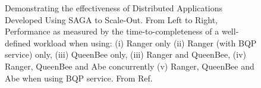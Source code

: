 \documentclass[a4paper,10pt]{article}
\begin{document}



\begin{figure}
\begin{center}
\end{center}
\caption{Demonstrating the effectiveness of Distributed Applications Developed  Using SAGA to Scale-Out. From Left to Right, Performance as measured by the time-to-completeness of a well-defined workload when using: (i) Ranger only (ii) Ranger (with BQP service) only, (iii) QueenBee only, (iii) Ranger and QueenBee, (iv) Ranger, QueenBee and Abe concurrently (v) Ranger, QueenBee 
  and Abe when using BQP service. From Ref.~\cite{gmac} }
\label{fig:results}
\end{figure}
\end{document}
